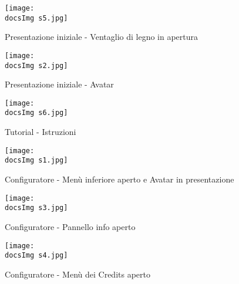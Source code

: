 	\begin{figure}[H]
		\centering
		\texttt{[image: \\docsImg s5.jpg]}
		\caption{Presentazione iniziale - Ventaglio di legno in apertura}
		\label{fig:Presentazione iniziale - Ventaglio di legno in apertura}
	\end{figure}
	
	\begin{figure}[H]
		\centering
		\texttt{[image: \\docsImg s2.jpg]}
		\caption{Presentazione iniziale - Avatar}
		\label{fig:Presentazione iniziale - Avatar}
	\end{figure}
		
	\begin{figure}[H]
		\centering
		\texttt{[image: \\docsImg s6.jpg]}
		\caption{Tutorial - Istruzioni}
		\label{fig:Tutorial - Istruzioni}
	\end{figure}	
	
	\begin{figure}[H]
		\centering
		\texttt{[image: \\docsImg s1.jpg]}
		\caption{Configuratore - Men\`u inferiore aperto e Avatar in presentazione}
		\label{fig:Configuratore - Menu' inferiore aperto e Avatar in presentazione}
	\end{figure}
	
	\begin{figure}[H]
		\centering
		\texttt{[image: \\docsImg s3.jpg]}
		\caption{Configuratore - Pannello info aperto}
		\label{fig:Configuratore - Pannello info aperto}
	\end{figure}
		
	\begin{figure}[H]
		\centering
		\texttt{[image: \\docsImg s4.jpg]}
		\caption{Configuratore - Men\`u dei Credits aperto}
		\label{fig:Configuratore - Menu' dei Credits aperto}
	\end{figure}